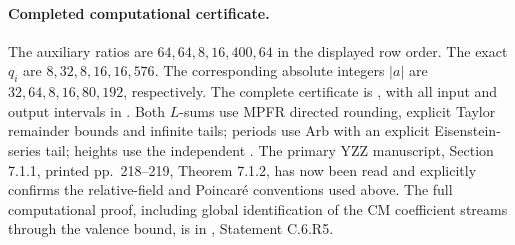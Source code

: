 \paragraph{Completed computational certificate.}
The auxiliary ratios are $64,64,8,16,400,64$ in the displayed row
order. The exact $q_i$ are $8,32,8,16,16,576$. The corresponding
absolute integers $|a|$ are $32,64,8,16,80,192$, respectively.
The complete certificate is ,
with all input and output intervals in
. Both $L$-sums use MPFR
directed rounding, explicit Taylor remainder bounds and infinite
tails; periods use Arb with an explicit Eisenstein-series tail;
heights use the independent .
The primary YZZ manuscript, Section 7.1.1, printed pp.~218--219,
Theorem 7.1.2, has now been read and explicitly confirms the
relative-field and Poincar\'e conventions used above. The full
computational proof, including global identification of the CM
coefficient streams through the valence bound, is in
, Statement C.6.R5.
